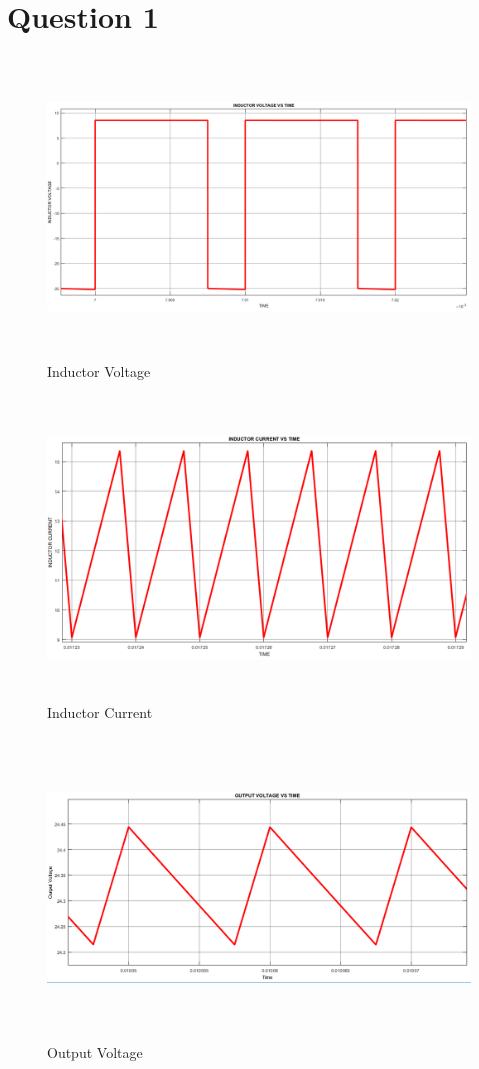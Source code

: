 \documentclass[oneside,12pt]{article}
\begin{document}
\section{Question 1}


\begin{figure}[H]
	\centering
	\includegraphics[width=14cm, height=8cm]{q1/V_L}
	\caption{Inductor Voltage}
	\label{fig:vl}
\end{figure}
\begin{figure}[H]
	\centering
	\includegraphics[width=14cm, height=8cm]{q1/I_L}
	\caption{Inductor Current}
	\label{fig:il}
\end{figure}
\begin{figure}[H]
	\centering
	\includegraphics[width=14cm, height=8cm]{q1/vout}
	\caption{Output Voltage}
	\label{fig:vout}
\end{figure}
\end{document}

